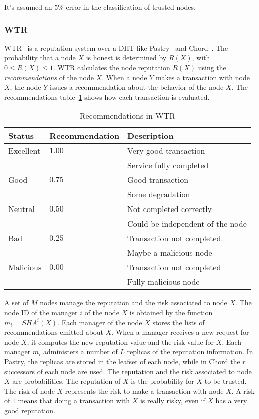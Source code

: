 It's assumed an $5\%$ error in the classification of trusted nodes.

\subsubsection{WTR}
\label{sec:wrt}
WTR~\cite{bonnaire2009wtr} is a reputation system over a DHT like Pastry~\cite{pastry} and
Chord~\cite{chord}. The probability that a node $X$ is honest is determined by
$R(X)$, with $0 \leq R(X) \leq 1$. WTR calculates the node reputation $R(X)$
using the \textit{recommendations} of the node $X$. When a node $Y$ makes a transaction with
node $X$, the node $Y$ issues a recommendation about the behavior of the node
$X$. The recommendations table~\ref{table:wtr_recomendations} shows how each
transaction is evaluated.
 
  \begin{table}
    \centering
    \footnotesize
    \begin{tabular}{|l|l|l|}
      \hline
      \textbf{Status} & \textbf{Recommendation} & \textbf{Description}\\
      \hline
      Excellent  & $1.00$    & Very good transaction\\
                &           & Service fully completed\\
      Good      & $0.75$    & Good transaction\\
                &           & Some degradation\\
      Neutral   & $0.50$     & Not completed correctly\\
                &           & Could be independent of the node\\
      Bad       & $0.25$    & Transaction not completed.\\
                &           & Maybe a malicious node\\
      Malicious & $0.00$    & Transaction not completed\\
                &           & Fully malicious node\\
      \hline
    \end{tabular}
    \caption{Recommendations in WTR}
    \label{table:wtr_recomendations}
  \end{table}

A set of $M$ nodes manage the reputation and the risk associated to node $X$.
The node ID of the manager $i$ of the node $X$ is
obtained by the function $m_i = SHA^{i}(X)$. Each manager of the node $X$
stores the lists of recommendations emitted about $X$. When a manager receives a
new request for node $X$, it computes the new reputation value and the risk
value for $X$.
Each manager $m_i$ administers a number of $L$ replicas of the reputation information. In Pastry,
the replicas are stored in the leafset of each node, while in Chord the $r$
successors of each node are used.
The reputation and the risk associated to node $X$ are probabilities. The
reputation of $X$ is the probability for $X$ to be trusted. The risk of node
$X$ represents the risk to make a transaction with node $X$. A risk of $1$
means that doing a transaction with $X$ is really risky, even if $X$ has a very
good reputation.

